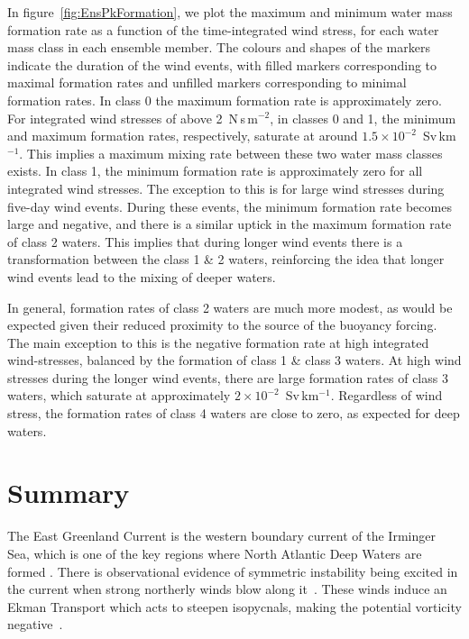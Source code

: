 In figure~\ref{fig:EnsPkFormation}, we plot the maximum and minimum water mass formation rate as a function of the time-integrated wind stress, for each water mass class in each ensemble member. The colours and shapes of the markers indicate the duration of the wind events, with filled markers corresponding to maximal formation rates and unfilled markers corresponding to minimal formation rates. In class 0 the maximum formation rate is approximately zero. For integrated wind stresses of above 2~N\,s\,m$^{-2}$, in classes 0 and 1, the minimum and maximum formation rates, respectively, saturate at around $1.5 \times 10^{-2}$~Sv\,km$^{-1}$. This implies a maximum mixing rate between these two water mass classes exists. In class 1, the minimum formation rate is approximately zero for all integrated wind stresses. The exception to this is for large wind stresses during five-day wind events. During these events, the minimum formation rate becomes large and negative, and there is a similar uptick in the maximum formation rate of class 2 waters. This implies that during longer wind events there is a transformation between the class 1 \& 2 waters, reinforcing the idea that longer wind events lead to the mixing of deeper waters.

In general, formation rates of class 2 waters are much more modest, as would be expected given their reduced proximity to the source of the buoyancy forcing. The main exception to this is the negative formation rate at high integrated wind-stresses, balanced by the formation of class 1 \& class 3 waters. At high wind stresses during the longer wind events, there are large formation rates of class 3 waters, which saturate at approximately $2 \times 10^{-2}$~Sv\,km$^{-1}$. Regardless of wind stress, the formation rates of class 4 waters are close to zero, as expected for deep waters.

\section{Summary}
\label{sec:IrmConc}
The East Greenland Current is the western boundary current of the Irminger Sea, which is one of the key regions where North Atlantic Deep Waters are formed \citep{Lozier2019}. There is observational evidence of symmetric instability being excited in the current when strong northerly winds blow along it~\citep{LeBras2022}. These winds induce an Ekman Transport which acts to steepen isopycnals, making the potential vorticity negative~\citep[e.g.][]{Straneo2002}.

